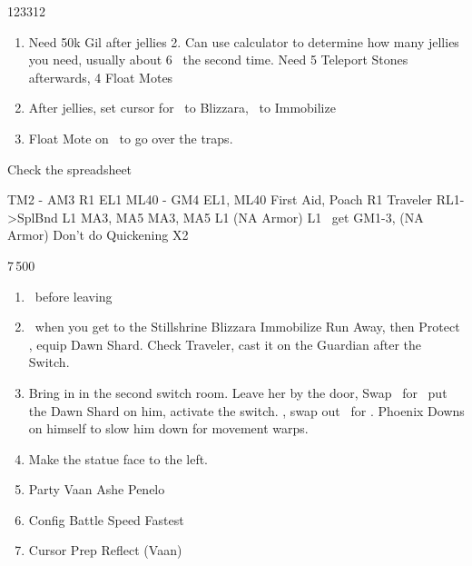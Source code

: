 \begin{shop}{123312}
\end{shop}
\begin{enumerate}
	\item Need 50k Gil after jellies 2. Can use calculator to determine how many jellies you need, usually about 6~ the second time. Need 5 Teleport Stones afterwards, 4 Float Motes
	\item After jellies, set cursor for \ashe\ to Blizzara, \penelo\ to Immobilize
	\item Float Mote on \vaan\ to go over the traps.
\end{enumerate}
\begin{liscense}
	Check the spreadsheet

	TM2 - AM3
	R1	EL1
	ML40 - GM4
	EL1, ML40
	First Aid, Poach					R1
	Traveler
	RL1->SplBnd
	L1					MA3, MA5
	MA3, MA5	L1
	(NA Armor)	L1
	\balthier\ get GM1-3, (NA Armor)
	Don't do Quickening X2
\end{liscense}
\begin{shop}{7\,500}
\end{shop}
\begin{enumerate}
	\item \save\ before leaving
	\item \save\ when you get to the Stillshrine
	      \ashef Blizzara \penelo
	      \penelof Immobilize \penelo
	      \vaanf Run Away, then Protect \vaan, equip Dawn Shard. Check Traveler, cast it on the Guardian after the Switch.
	\item Bring in \penelo in the second switch room. Leave her by the door, Swap \vaan\ for \balthier\, put the Dawn Shard on him, activate the switch. \leader{\penelo}, swap out \penelo\ for \vaan.
	      \balthierf Phoenix Downs on himself to slow him down for movement warps.
	\item Make the statue face to the left.
	\item Party	Vaan	Ashe	Penelo
	\item Config	Battle Speed	Fastest
	\item Cursor	Prep Reflect (Vaan)
\end{enumerate}

